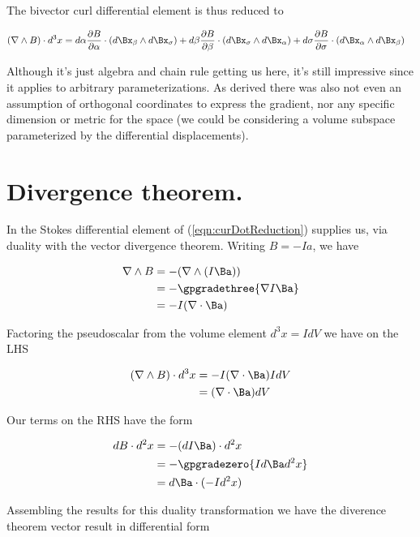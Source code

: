 The bivector curl differential element is thus reduced to

\begin{align}\label{eqn:curDotReduction}
(\grad \wedge B) \cdot d^3 x
&=
 d\alpha \PD{\alpha}{B} \cdot (d\Bx_\beta \wedge d\Bx_\sigma)
+d\beta \PD{\beta}{B} \cdot (d\Bx_\sigma \wedge d\Bx_\alpha)
+d\sigma \PD{\sigma}{B} \cdot (d\Bx_\alpha \wedge d\Bx_\beta)
\end{align}

Although it's just algebra and chain rule getting us here, it's still impressive since it applies to arbitrary parameterizations.  As derived there was also not even an assumption of orthogonal coordinates to express the gradient, nor any specific dimension or metric for the space (we could be considering a volume subspace parameterized by the differential displacements).

\section{Divergence theorem.}

In  the Stokes differential element of (\ref{eqn:curDotReduction}) supplies us, via duality with the vector divergence theorem.  Writing $B = -I a$, we have

\begin{align*}
\grad \wedge B
&= -(\grad \wedge (I\Ba)) \\
&= - \gpgradethree{ \grad I\Ba } \\
&= - I (\grad \cdot \Ba )
\end{align*}

Factoring the pseudoscalar from the volume element $d^3 x = I dV$ we have on the LHS

\begin{align*}
(\grad \wedge B) \cdot d^3 x
&= - I (\grad \cdot \Ba ) I dV \\
&= (\grad \cdot \Ba ) dV \\
\end{align*}

Our terms on the RHS have the form

\begin{align*}
d B \cdot d^2 x
&=
-(d I \Ba) \cdot d^2 x \\
&=
- \gpgradezero{ I d \Ba d^2 x } \\
&=
d \Ba \cdot (-I d^2 x)
\end{align*}

Assembling the results for this duality transformation we have the diverence theorem vector result in differential form

